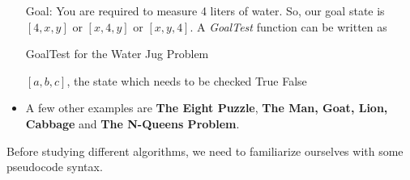 \documentclass[a4paper]{article}
\begin{document}
\begin{itemize}
    Goal: You are required to measure 4 liters of water. So, our goal state is $[4,x,y]$ or $[x,4,y]$ or $[x,y,4]$. A \textit{GoalTest} function can be written as
    \begin{algorithm}[H]
    \caption{GoalTest for the Water Jug Problem}\label{alg:AI-goal-test-water-jug}
        \begin{algorithmic}[1]
            \Require $[a,b,c]$, the state which needs to be checked
                \State \Return True
            \EndIf
            \State \Return False
        \end{algorithmic}
    \end{algorithm}
    \item A few other examples are \textbf{The Eight Puzzle}, \textbf{The Man, Goat, Lion, Cabbage} and \textbf{The N-Queens Problem}.
\end{itemize}
Before studying different algorithms, we need to familiarize ourselves with some pseudocode syntax.

\pagebreak
\setlength{\voffset}{0cm}
\setlength{\hoffset}{0cm}

\setlength{\voffset}{\originalVOffset}
\setlength{\hoffset}{\originalHOffset}
\pagebreak
\setlength{\voffset}{0cm}
\setlength{\hoffset}{0cm}

\setlength{\voffset}{\originalVOffset}
\setlength{\hoffset}{\originalHOffset}
\pagebreak
\setlength{\voffset}{0cm}
\setlength{\hoffset}{0cm}

\setlength{\voffset}{\originalVOffset}
\setlength{\hoffset}{\originalHOffset}
\pagebreak
\setlength{\voffset}{0cm}
\setlength{\hoffset}{0cm}

\setlength{\voffset}{\originalVOffset}
\setlength{\hoffset}{\originalHOffset}
\pagebreak
\end{document}
